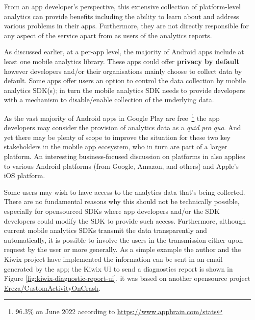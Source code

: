 From an app developer's perspective, this extensive collection of platform-level analytics can provide benefits including the ability to learn about and address various problems in their apps. Furthermore, they are not directly responsible for any aspect of the service apart from as users of the analytics reports.

As discussed earlier, at a per-app level, the majority of Android apps include at least one mobile analytics library. These apps could offer \textbf{privacy by default} however developers and/or their organisations mainly choose to collect data by default. Some apps offer users an option to control the data collection by mobile analytics SDK(s); in turn the mobile analytics SDK needs to  provide developers with a mechanism to disable/enable collection of the underlying data.

As the vast majority of Android apps in Google Play are free~\footnote{96.3\% on  June 2022 according to \url{https://www.appbrain.com/stats}} the app developers may consider the provision of analytics data as a \emph{quid pro quo}. And yet there may be plenty of scope to improve the situation for these two key stakeholders in the mobile app ecosystem, who in turn are part of a larger platform. An interesting business-focused discussion on platforms in  also applies to various Android platforms (from Google, Amazon, and others) and Apple's iOS platform.

Some users may wish to have access to the analytics data that's being collected. There are no fundamental reasons why this should not be technically possible, especially for opensourced SDKs where app developers and/or the SDK developers could modify the SDK to provide such access. Furthermore, although current mobile analytics SDKs transmit the data transparently and automatically, it is possible to involve the users in the transmission either upon request by the user or more generally. As a simple example the author and the Kiwix project have implemented the information can be sent in an email generated by the app; the Kiwix UI to send a diagnostics report is shown in Figure \ref{fig:kiwix-diagnostic-report-ui}, it was based on another opensource project \href{https://github.com/Ereza/CustomActivityOnCrash}{Ereza/CustomActivityOnCrash}. %

